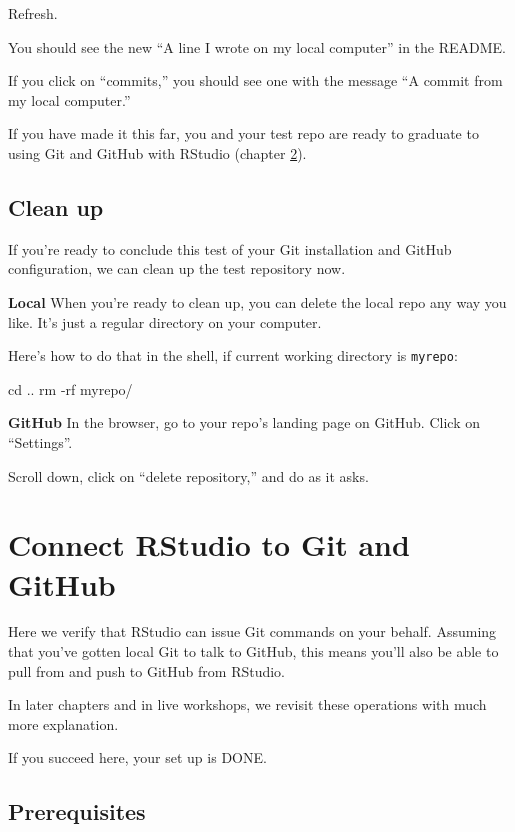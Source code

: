 \documentclass[
]{book}
\newenvironment{Shaded}{\begin{snugshade}}{\end{snugshade}}
\newcommand{\NormalTok}[1]{#1}
\begin{document}
Refresh.

You should see the new ``A line I wrote on my local computer'' in the README.

If you click on ``commits,'' you should see one with the message ``A commit from my local computer.''

If you have made it this far, you and your test repo are ready to graduate to using Git and GitHub with RStudio (chapter \ref{rstudio-git-github}).

\section{Clean up}\label{clean-up}

If you're ready to conclude this test of your Git installation and GitHub configuration, we can clean up the test repository now.

\textbf{Local} When you're ready to clean up, you can delete the local repo any way you like. It's just a regular directory on your computer.

Here's how to do that in the shell, if current working directory is \texttt{myrepo}:

\begin{Shaded}
\begin{Highlighting}[]
\NormalTok{cd ..}
\NormalTok{rm {-}rf myrepo/}
\end{Highlighting}
\end{Shaded}

\textbf{GitHub} In the browser, go to your repo's landing page on GitHub.
Click on ``Settings''.

Scroll down, click on ``delete repository,'' and do as it asks.

\chapter{Connect RStudio to Git and GitHub}\label{rstudio-git-github}

Here we verify that RStudio can issue Git commands on your behalf.
Assuming that you've gotten local Git to talk to GitHub, this means you'll also be able to pull from and push to GitHub from RStudio.

In later chapters and in live workshops, we revisit these operations with much more explanation.

If you succeed here, your set up is DONE.

\section{Prerequisites}\label{prerequisites}
\end{document}
